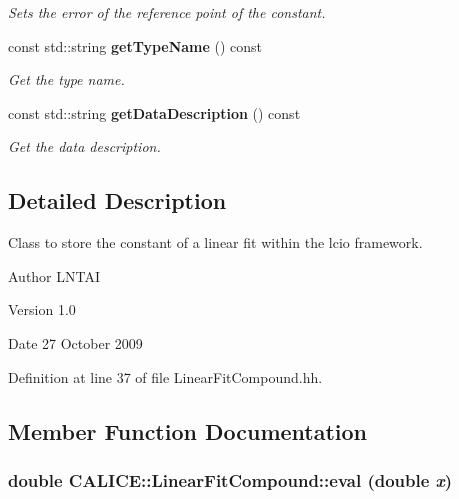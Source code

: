 \begin{DoxyCompactItemize}
\begin{DoxyCompactList}\small\item\em Sets the error of the reference point of the constant. \item\end{DoxyCompactList}\item 
const std::string {\bf getTypeName} () const 
\begin{DoxyCompactList}\small\item\em Get the type name. \item\end{DoxyCompactList}\item 
const std::string {\bf getDataDescription} () const 
\begin{DoxyCompactList}\small\item\em Get the data description. \item\end{DoxyCompactList}\end{DoxyCompactItemize}


\subsection{Detailed Description}
Class to store the constant of a linear fit within the lcio framework. \begin{DoxyAuthor}{Author}
LNTAI 
\end{DoxyAuthor}
\begin{DoxyVersion}{Version}
1.0 
\end{DoxyVersion}
\begin{DoxyDate}{Date}
27 October 2009 
\end{DoxyDate}


Definition at line 37 of file LinearFitCompound.hh.

\subsection{Member Function Documentation}
\subsubsection[{eval}]{\setlength{\rightskip}{0pt plus 5cm}double CALICE::LinearFitCompound::eval (double {\em x})\hspace{0.3cm}{\ttfamily  [inline]}}\label{classCALICE_1_1LinearFitCompound_a6a90eaa22d28b9223e5c67800cb41192}


